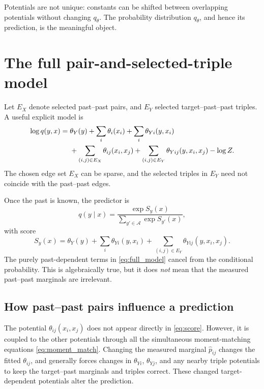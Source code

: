 \documentclass[11pt]{article}
\newcommand{\1}{\mathbf 1}
\newcommand{\mcA}{\mathcal A}
\newcommand{\hatp}{\widehat p}
\begin{document}
\begin{warningbox}
Potentials are not unique: constants can be shifted between overlapping
potentials without changing \(q_\theta\).  The probability distribution
\(q_\theta\), and hence its prediction, is the meaningful object.
\end{warningbox}

\section{The full pair-and-selected-triple model}

Let \(E_X\) denote selected past--past pairs, and \(E_Y\) selected
target--past--past triples.  A useful explicit model is
\begin{align}
  \log q(y,x)
  ={}&
  \theta_Y(y)
  +\sum_i\theta_i(x_i)
  +\sum_i\theta_{Yi}(y,x_i) \notag\\
  &+\sum_{(i,j)\in E_X}\theta_{ij}(x_i,x_j)
  +\sum_{(i,j)\in E_Y}\theta_{Yij}(y,x_i,x_j)
  -\log Z.
  \label{eq:full_model}
\end{align}
The chosen edge set \(E_X\) can be sparse, and the selected triples in \(E_Y\)
need not coincide with the past--past edges.

Once the past is known, the predictor is
\begin{equation}
  q(y\mid x)
  =
  \frac{\exp S_y(x)}
       {\sum_{y'\in\mcA}\exp S_{y'}(x)},
  \label{eq:conditional_score}
\end{equation}
with score
\begin{equation}
  S_y(x)
  =
  \theta_Y(y)
  +\sum_i\theta_{Yi}(y,x_i)
  +\sum_{(i,j)\in E_Y}\theta_{Yij}(y,x_i,x_j).
  \label{eq:score}
\end{equation}
The purely past-dependent terms in \eqref{eq:full_model} cancel from the
conditional probability.  This is algebraically true, but it does \emph{not}
mean that the measured past--past marginals are irrelevant.

\subsection{How past--past pairs influence a prediction}

The potential \(\theta_{ij}(x_i,x_j)\) does not appear directly in
\eqref{eq:score}.  However, it is coupled to the other potentials through all
the simultaneous moment-matching equations \eqref{eq:moment_match}.  Changing
the measured marginal \(\hatp_{ij}\) changes the fitted
\(\theta_{ij}\), and generally forces changes in
\(\theta_{Yi}\), \(\theta_{Yj}\), and any nearby triple potentials to keep the
target--past marginals and triples correct.  These changed target-dependent
potentials alter the prediction.
\end{document}
